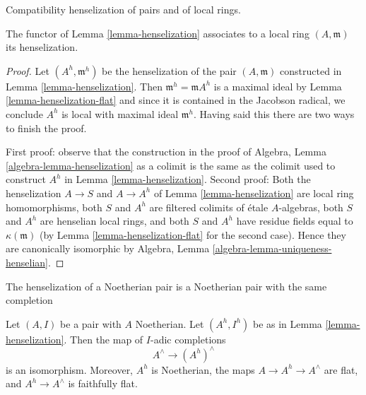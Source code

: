 \begin{lemma}
\label{lemma-henselization-local-ring}
\begin{slogan}
Compatibility henselization of pairs and of local rings.
\end{slogan}
The functor of Lemma \ref{lemma-henselization} associates to a local ring
$(A, \mathfrak m)$ its henselization.
\end{lemma}

\begin{proof}
Let $(A^h, \mathfrak m^h)$ be the henselization of the pair $(A, \mathfrak m)$
constructed in Lemma \ref{lemma-henselization}. Then
$\mathfrak m^h = \mathfrak m A^h$ is a maximal ideal
by Lemma \ref{lemma-henselization-flat} and since it
is contained in the Jacobson radical, we conclude $A^h$ is
local with maximal ideal $\mathfrak m^h$. Having said this
there are two ways to finish the proof.

\medskip\noindent
First proof: observe that the construction in the proof of
Algebra, Lemma \ref{algebra-lemma-henselization} as a colimit
is the same as the colimit used to construct $A^h$ in
Lemma \ref{lemma-henselization}.
Second proof: Both the henselization $A \to S$ and $A \to A^h$ of
Lemma \ref{lemma-henselization} are local ring homomorphisms,
both $S$ and $A^h$ are filtered colimits of \'etale $A$-algebras,
both $S$ and $A^h$ are henselian local rings, and both $S$ and $A^h$
have residue fields equal to $\kappa(\mathfrak m)$ (by
Lemma \ref{lemma-henselization-flat} for the second case).
Hence they are canonically isomorphic by
Algebra, Lemma \ref{algebra-lemma-uniqueness-henselian}.
\end{proof}

\begin{lemma}
\label{lemma-henselization-Noetherian-pair}
\begin{slogan}
The henselization of a Noetherian pair is a Noetherian pair
with the same completion
\end{slogan}
Let $(A, I)$ be a pair with $A$ Noetherian.  Let $(A^h, I^h)$ be as in 
Lemma \ref{lemma-henselization}. Then the map of $I$-adic completions
$$
A^\wedge \to (A^h)^\wedge
$$
is an isomorphism. Moreover, $A^h$ is Noetherian, the maps
$A \to A^h \to A^\wedge$ are flat, and $A^h \to A^\wedge$ is
faithfully flat.
\end{lemma}

